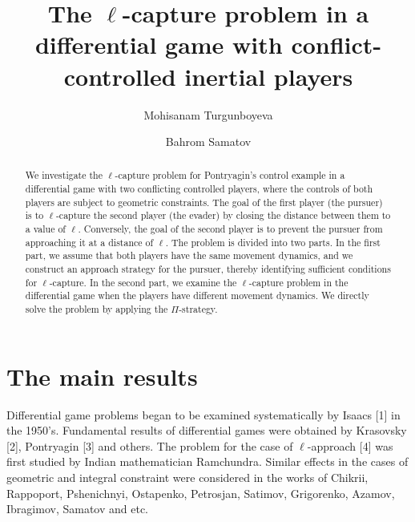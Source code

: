 \documentclass[12pt]{llncs}
\begin{document}
\fi

\title{The $\ell$-capture problem in a differential game with conflict-controlled inertial players}

\author{Mohisanam Turgunboyeva  \and  Bahrom Samatov
  }

\maketitle

\begin{abstract}
We investigate the $\ell$-capture problem for Pontryagin's control example in a differential game with two conflicting controlled players, where the controls of both players are subject to geometric constraints. The goal of the first player (the pursuer) is to $\ell$-capture the second player (the evader) by closing the distance between them to a value of $\ell$. Conversely, the goal of the second player is to prevent the pursuer from approaching it at a distance of $\ell$. The problem is divided into two parts. In the first part, we assume that both players have the same movement dynamics, and we construct an approach strategy for the pursuer, thereby identifying sufficient conditions for $\ell$-capture. In the second part, we examine the $\ell$-capture problem in the differential game when the players have different movement dynamics. We directly solve the problem by applying the $\Pi$-strategy.


\end{abstract}


\section{The main results} %

Differential game problems began to be examined systematically by Isaacs [1] in the 1950's. Fundamental results of differential games were
obtained by Krasovsky [2], Pontryagin [3] and others. The problem for the case of $\ell$-approach [4] was first studied by Indian mathematician Ramchundra. Similar effects in the cases of geometric and integral constraint were considered in the works of Chikrii,
Rappoport, Pshenichnyi, Ostapenko, Petrosjan, Satimov, Grigorenko, Azamov, Ibragimov, Samatov and etc.
\end{document}
